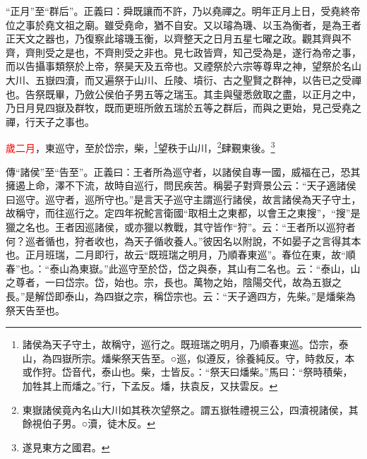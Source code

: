 {\noindent\shu{}\fzkt “正月”至“群后”。正義曰：舜既讓而不許，乃以堯禪之。明年正月上日，受堯終帝位之事於堯文祖之廟。雖受堯命，猶不自安。又以璿為璣、以玉為衡者，是為王者正天文之器也，乃復察此璿璣玉衡，以齊整天之日月五星七曜之政。觀其齊與不齊，齊則受之是也，不齊則受之非也。見七政皆齊，知己受為是，遂行為帝之事，而以告攝事類祭於上帝，祭昊天及五帝也。又禋祭於六宗等尊卑之神，望祭於名山大川、五嶽四瀆，而又遍祭于山川、丘陵、墳衍、古之聖賢之群神，以告已之受禪也。告祭既畢，乃斂公侯伯子男五等之瑞玉。其圭與璧悉斂取之盡，以正月之中，乃日月見四嶽及群牧，既而更班所斂五瑞於五等之群后，而與之更始，見己受堯之禪，行天子之事也。 \par}

\textcolor{red}{歲二月}，東巡守，至於岱宗，柴，\footnote{諸侯為天子守土，故稱守，巡行之。既班瑞之明月，乃順春東巡。岱宗，泰山，為四嶽所宗。燔柴祭天告至。○巡，似遵反，徐養純反。守，時救反，本或作狩。岱音代，泰山也。柴，士皆反。：“祭天曰燔柴。”馬曰：“祭時積柴，加牲其上而燔之。”行，下孟反。燔，扶袁反，又扶雲反。}望秩于山川，\footnote{東嶽諸侯竟內名山大川如其秩次望祭之。謂五嶽牲禮視三公，四瀆視諸侯，其餘視伯子男。○瀆，徒木反。}肆覲東後。\footnote{遂見東方之國君。}

{\noindent\zhuan{}\fzbyks 傳“諸侯”至“告至”。正義曰：王者所為巡守者，以諸侯自專一國，威福在己，恐其擁遏上命，澤不下流，故時自巡行，問民疾苦。稱晏子對齊景公云：“天子適諸侯曰巡守。巡守者，巡所守也。”是言天子巡守主謂巡行諸侯，故言諸侯為天子守土，故稱守，而往巡行之。定四年祝鮀言衛國“取相土之東都，以會王之東搜”，“搜”是獵之名也。王者因巡諸侯，或亦獵以教戰，其守皆作“狩”。云：“王者所以巡狩者何？巡者循也，狩者收也，為天子循收養人。”彼因名以附說，不如晏子之言得其本也。正月班瑞，二月即行，故云“既班瑞之明月，乃順春東巡”。春位在東，故“順春”也。：“泰山為東嶽。”此巡守至於岱，岱之與泰，其山有二名也。云：“泰山，山之尊者，一曰岱宗。岱，始也。宗，長也。萬物之始，陰陽交代，故為五嶽之長。”是解岱即泰山，為四嶽之宗，稱岱宗也。云：“天子適四方，先柴。”是燔柴為祭天告至也。 \par}

